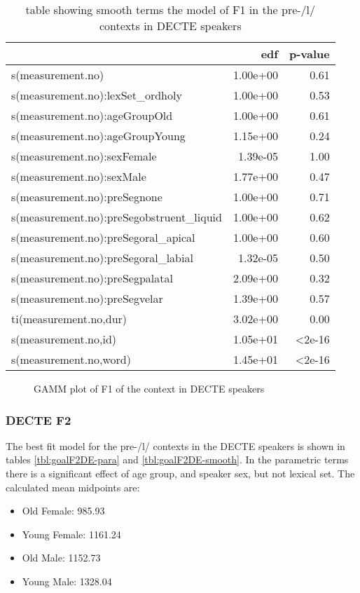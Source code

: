 \documentclass[../../../00.FullDoc/tex/Thesis]{subfiles}
\begin{document}
\begin{table}[htbp]
	\centering
	\begin{tabular}{lrr}
		\hline
		& edf & p-value \\
		\hline
		s(measurement.no) & 1.00e+00 & 0.61 \\
		s(measurement.no):lexSet\_ordholy & 1.00e+00 & 0.53 \\
		s(measurement.no):ageGroupOld & 1.00e+00 & 0.61 \\
		s(measurement.no):ageGroupYoung & 1.15e+00 & 0.24 \\
		s(measurement.no):sexFemale & 1.39e-05 & 1.00 \\
		s(measurement.no):sexMale & 1.77e+00 & 0.47 \\
		s(measurement.no):preSegnone & 1.00e+00 & 0.71 \\
		s(measurement.no):preSegobstruent\_liquid & 1.00e+00 & 0.62 \\
		s(measurement.no):preSegoral\_apical & 1.00e+00 & 0.60 \\
		s(measurement.no):preSegoral\_labial & 1.32e-05 & 0.50 \\
		s(measurement.no):preSegpalatal & 2.09e+00 & 0.32 \\
		s(measurement.no):preSegvelar & 1.39e+00 & 0.57 \\
		ti(measurement.no,dur) & 3.02e+00 & 0.00 \\
		s(measurement.no,id) & 1.05e+01 & <2e-16 \\
		s(measurement.no,word) & 1.45e+01 & <2e-16 \\
		\hline
	\end{tabular}
	\caption{table showing smooth terms the model of F1 in the pre-/l/ contexts in DECTE speakers}
	\label{tbl:goalF1DE-smooth}%
\end{table}

\begin{center}
	\begin{figure}[h]
		
		\caption{GAMM plot of F1 of the \goal{} context in DECTE speakers} \label{fig:goalF1DE}
	\end{figure}
\end{center}

\subsubsection{DECTE F2}
The best fit model for the pre-/l/ contexts in the DECTE speakers is shown in tables \ref{tbl:goalF2DE-para} and \ref{tbl:goalF2DE-smooth}. In the parametric terms there is a significant effect of age group, and speaker sex, but not lexical set. The calculated mean midpoints are:
\begin{itemize}
	\item Old Female: 985.93
	\item Young Female:	1161.24
	\item Old Male: 1152.73
	\item Young Male: 1328.04
\end{itemize}
\end{document}
